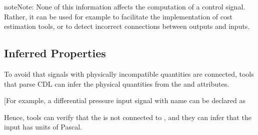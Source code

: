 \documentclass[letterpaper,10pt, openany,english]{sphinxmanual}
\begin{document}
\begin{sphinxadmonition}{note}{Note:}
None of this information affects the computation of a control signal.
Rather, it can be used for example to facilitate the implementation of cost estimation tools,
or to detect incorrect connections between outputs and inputs.
\end{sphinxadmonition}


\subsection{Inferred Properties}
\label{\detokenize{cdl:inferred-properties}}\label{\detokenize{cdl:sec-inf-pro}}
To avoid that signals with physically incompatible quantities
are connected, tools that parse CDL can infer the physical quantities
from the  and  attributes.

{[}For example, a differential pressure input signal with name 
can be declared as

\begin{sphinxVerbatim}[commandchars=\\\{\}]
 
     
\end{sphinxVerbatim}

Hence, tools can verify that the  is not connected
to , and they can infer that the input has units of Pascal.
\end{document}
